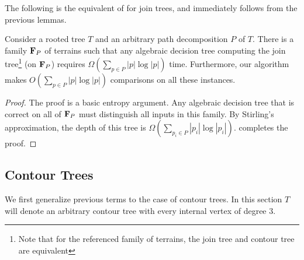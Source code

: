 {The following is the equivalent of  for join trees, and immediately follows from
the previous lemmas.

\begin{theorem}\label{thm:joinLB}
Consider a rooted tree $T$ and an arbitrary path decomposition $P$ of $T$.
There is a family ${\bf F}_P$ of terrains such that any algebraic decision
tree computing the join tree\footnote{Note that for the referenced family of terrains, the join tree and contour tree are equivalent} 
(on ${\bf F}_P$) requires $\Omega(\sum_{p \in P} |p|\log |p|)$ time.
Furthermore, our algorithm makes $O(\sum_{p \in P} |p|\log |p|)$ comparisons on all these instances.
%
\end{theorem}

\begin{proof}
The proof is a basic entropy argument. Any algebraic decision tree that is correct on all of ${\bf F}_P$
must distinguish all inputs in this family. By Stirling's approximation, the depth of this tree is $\Omega(\sum_{p_i\in P} |p_i|\log|p_i|)$.
 completes the proof.
%
%
\end{proof}

\subsection{Contour Trees}
We first generalize previous terms to the case of contour trees.
In this section $T$ will denote an arbitrary contour tree with every internal vertex of degree $3$.

}
